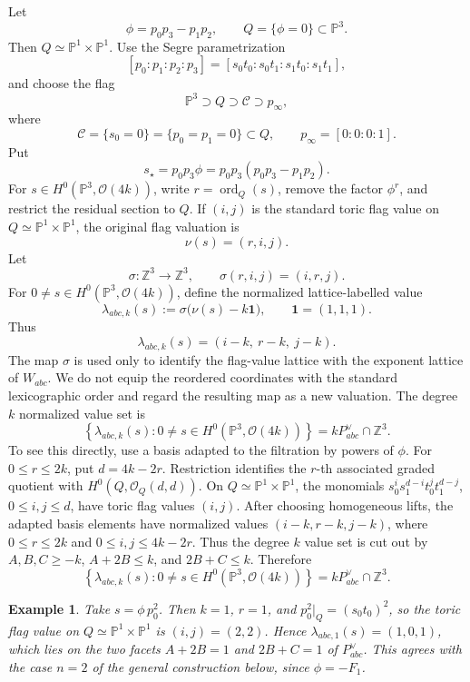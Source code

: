 \documentclass{article}
\newtheorem{exam}[thm]{Example}
\newcommand{\ZZ}{\mathbb{Z}}
\newcommand{\PP}{\mathbb{P}}
\begin{document}
Let
\[
\phi=p_0p_3-p_1p_2,
\qquad
Q=\{\phi=0\}\subset\PP^3.
\]
Then \(Q\simeq\PP^1\times\PP^1\). Use the Segre parametrization
\[
[p_0:p_1:p_2:p_3]
=
[s_0t_0:s_0t_1:s_1t_0:s_1t_1],
\]
and choose the flag
\[
\PP^3\supset Q\supset \mathcal C\supset p_\infty,
\]
where
\[
\mathcal C=\{s_0=0\}=\{p_0=p_1=0\}\subset Q,
\qquad
p_\infty=[0:0:0:1].
\]
Put
\[
s_\star=p_0p_3\phi=p_0p_3(p_0p_3-p_1p_2).
\]
For \(s\in H^0(\PP^3,\mathcal O(4k))\), write \(r=\operatorname{ord}_Q(s)\), remove the factor \(\phi^r\), and restrict the residual section to \(Q\). If \((i,j)\) is the standard toric flag value on \(Q\simeq\PP^1\times\PP^1\), the original flag valuation is
\[
\nu(s)=(r,i,j).
\]
Let
\[
\sigma:\ZZ^3\longrightarrow\ZZ^3,
\qquad
\sigma(r,i,j)=(i,r,j).
\]
For \(0\ne s\in H^0(\PP^3,\mathcal O(4k))\), define the normalized lattice-labelled value
\[
\lambda_{abc,k}(s)
:=
\sigma\bigl(\nu(s)-k\mathbf 1\bigr),
\qquad
\mathbf 1=(1,1,1).
\]
Thus
\[
\lambda_{abc,k}(s)
=
(i-k,\ r-k,\ j-k).
\]
The map \(\sigma\) is used only to identify the flag-value lattice with the exponent lattice of \(W_{abc}\). We do not equip the reordered coordinates with the standard lexicographic order and regard the resulting map as a new valuation.
The degree \(k\) normalized value set is
\[
\left\{
\lambda_{abc,k}(s):
0\ne s\in H^0(\PP^3,\mathcal O(4k))
\right\}
=
kP_{abc}^{\vee}\cap\ZZ^3.
\]
To see this directly, use a basis adapted to the filtration by powers of \(\phi\). For \(0\le r\le 2k\), put \(d=4k-2r\). Restriction identifies the \(r\)-th associated graded quotient with \(H^0(Q,\mathcal O_Q(d,d))\). On \(Q\simeq\PP^1\times\PP^1\), the monomials \(s_0^is_1^{d-i}t_0^jt_1^{d-j}\), \(0\le i,j\le d\), have toric flag values \((i,j)\). After choosing homogeneous lifts, the adapted basis elements have normalized values \((i-k,r-k,j-k)\), where \(0\le r\le2k\) and \(0\le i,j\le4k-2r\). Thus the degree \(k\) value set is cut out by \(A,B,C\ge-k\), \(A+2B\le k\), and \(2B+C\le k\). Therefore
\[
\left\{
\lambda_{abc,k}(s):
0\ne s\in H^0(\PP^3,\mathcal O(4k))
\right\}
=
kP_{abc}^\vee\cap\ZZ^3.
\]

\begin{exam}
Take \(s=\phi\,p_0^2\). Then \(k=1\), \(r=1\), and \(p_0^2|_Q=(s_0t_0)^2\), so the toric flag value on \(Q\simeq\PP^1\times\PP^1\) is \((i,j)=(2,2)\). Hence \(\lambda_{abc,1}(s)=(1,0,1)\), which lies on the two facets \(A+2B=1\) and \(2B+C=1\) of \(P_{abc}^\vee\). This agrees with the case \(n=2\) of the general construction below, since \(\phi=-F_1\).
\end{exam}
\end{document}
